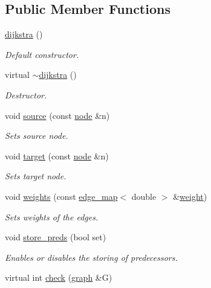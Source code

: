 \subsection*{Public Member Functions}
\begin{DoxyCompactItemize}
\item 
\mbox{\hyperlink{classdijkstra_a64a1fcb9cca32ff932b9b98a08cff106}{dijkstra}} ()
\begin{DoxyCompactList}\small\item\em Default constructor. \end{DoxyCompactList}\item 
virtual \mbox{\hyperlink{classdijkstra_a871e3c8097b7f0bc17358473b1149515}{$\sim$dijkstra}} ()
\begin{DoxyCompactList}\small\item\em Destructor. \end{DoxyCompactList}\item 
void \mbox{\hyperlink{classdijkstra_a9689f2628f76ddb3747ea18c91bd7041}{source}} (const \mbox{\hyperlink{classnode}{node}} \&n)
\begin{DoxyCompactList}\small\item\em Sets source node. \end{DoxyCompactList}\item 
void \mbox{\hyperlink{classdijkstra_a1e9971d767046306574551a461aa2238}{target}} (const \mbox{\hyperlink{classnode}{node}} \&n)
\begin{DoxyCompactList}\small\item\em Sets target node. \end{DoxyCompactList}\item 
void \mbox{\hyperlink{classdijkstra_a92f4394b757f6ffcb372535114a6cbf6}{weights}} (const \mbox{\hyperlink{classedge__map}{edge\+\_\+map}}$<$ double $>$ \&\mbox{\hyperlink{classdijkstra_ac077e6b471b7178d7aef78e54c6a07cf}{weight}})
\begin{DoxyCompactList}\small\item\em Sets weights of the edges. \end{DoxyCompactList}\item 
void \mbox{\hyperlink{classdijkstra_af79383dbbb6b737afcefd8e32350192d}{store\+\_\+preds}} (bool set)
\begin{DoxyCompactList}\small\item\em Enables or disables the storing of predecessors. \end{DoxyCompactList}\item 
virtual int \mbox{\hyperlink{classdijkstra_a51ff4657e0ddb1ca5231a21e6dea1808}{check}} (\mbox{\hyperlink{classgraph}{graph}} \&G)

\end{DoxyCompactItemize}
